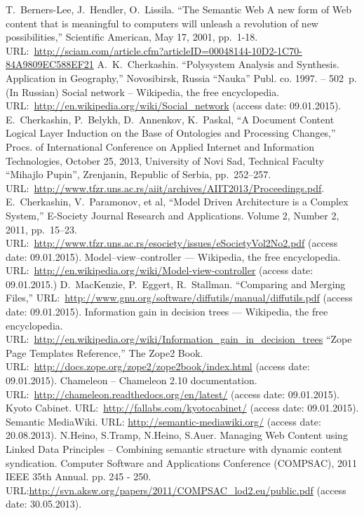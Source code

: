 \documentclass[conference]{IEEEtran}
\begin{document}
\begin{thebibliography}{11}
 T.~Berners-Lee, J.~Hendler, O.~Lissila. ``The
  Semantic Web A new form of Web content that is meaningful to
  computers will unleash a revolution of new possibilities,''
  Scientific American, May 17, 2001,
  pp.~1-18. URL:~\url{http://sciam.com/article.cfm?articleID=00048144-10D2-1C70-84A9809EC588EF21}
 A.~K.~Cherkashin. ``Polysystem Analysis and
  Synthesis. Application in Geography,'' Novosibirsk, Russia ``Nauka'' Publ. co.
  1997. -- 502~p. (In Russian)
 Social network -- Wikipedia, the free encyclopedia.
  URL:~\url{http://en.wikipedia.org/wiki/Social_network} (access date: 09.01.2015).
 E.~Cherkashin, P.~Belykh, D.~Annenkov, K.~Paskal, ``A
  Document Content Logical Layer Induction on the Base of Ontologies
  and Processing Changes,'' Procs. of International Conference on
  Applied Internet and Information Technologies, October 25, 2013,
  University of Novi Sad, Technical Faculty ``Mihajlo Pupin'',
  Zrenjanin, Republic of Serbia,
  pp.~252--257. URL:~\url{http://www.tfzr.uns.ac.rs/aiit/archives/AIIT2013/Proceedings.pdf}.
 E.~Cherkashin, V.~Paramonov, et al, ``Model Driven
  Architecture is a Complex System,'' E-Society Journal Research and
  Applications. Volume 2, Number 2, 2011, pp.~15--23.
  URL:~\url{http://www.tfzr.uns.ac.rs/esociety/issues/eSocietyVol2No2.pdf} (access date: 09.01.2015).
 Model--view--controller --- Wikipedia, the free
  encyclopedia.
  URL:~\url{http://en.wikipedia.org/wiki/Model-view-controller} (access date: 09.01.2015.)
 D.~MacKenzie, P.~Eggert, R.~Stallman. ``Comparing and Merging Files,''
  URL:~\url{http://www.gnu.org/software/diffutils/manual/diffutils.pdf} (access date: 09.01.2015).
 Information gain in decision trees ---  Wikipedia, the free
  encyclopedia. URL:~\url{http://en.wikipedia.org/wiki/Information_gain_in_decision_trees}
 ``Zope Page Templates Reference,'' The Zope2 Book. URL:~\url{http://docs.zope.org/zope2/zope2book/index.html} (access date: 09.01.2015).
 Chameleon -- Chameleon 2.10 documentation.
  URL:~\url{http://chameleon.readthedocs.org/en/latest/}  (access date: 09.01.2015).
 Kyoto Cabinet. URL:~\url{http://fallabs.com/kyotocabinet/} (access date: 09.01.2015).
 Semantic MediaWiki. URL: \url{http://semantic-mediawiki.org/} (access date: 20.08.2013).
 N.Heino, S.Tramp, N.Heino, S.Auer. Managing Web Content using Linked Data Principles – Combining semantic structure with dynamic content syndication. Computer Software and Applications Conference (COMPSAC), 2011 IEEE 35th Annual. pp. 245 - 250. URL:\url{http://svn.aksw.org/papers/2011/COMPSAC_lod2.eu/public.pdf} (access date: 30.05.2013).

\end{thebibliography}
\vspace{-2em}\mbox{} %
\end{document}
